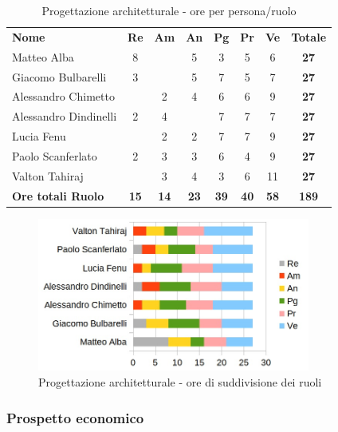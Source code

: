 		\begin{table} [h!]
			\begin{center}
				\begin{tabular} { m{3.5cm} c c c c c c c }
					\rowcolor{lightgray}
					\textbf{Nome} & \textbf{Re} & \textbf{Am} & \textbf{An} & \textbf{Pg} & \textbf{Pr} & \textbf{Ve} & \textbf{Totale} \\
					Matteo Alba & 8 & & 5 & 3 & 5 & 6 & \textbf{27} \\
					Giacomo Bulbarelli & 3 & & 5 & 7 & 5 & 7 & \textbf{27} \\
					Alessandro Chimetto & & 2 & 4 & 6 & 6 & 9 & \textbf{27} \\
					Alessandro Dindinelli & 2 & 4 & & 7 & 7 & 7 & \textbf{27} \\
					Lucia Fenu & & 2 & 2 & 7 & 7 & 9 & \textbf{27} \\
					Paolo Scanferlato & 2 & 3 & 3 & 6 & 4 & 9 & \textbf{27} \\
					Valton Tahiraj & & 3 & 4 & 3 & 6 & 11 & \textbf{27} \\
					\textbf{Ore totali Ruolo} & \textbf{15} & \textbf{14} & \textbf{23} & \textbf{39} & \textbf{40}& \textbf{58} & \textbf{189}
				\end{tabular}
				\caption{Progettazione architetturale - ore per persona/ruolo}
			\end{center}
		\end{table}
		
		\begin{figure} [h!]
			\centering
			\includegraphics[width=0.8\textwidth]{res/img/grafici/progettazione_architetturale_ore_ruolo.jpg}
			\caption{Progettazione architetturale - ore di suddivisione dei ruoli} 
		\end{figure}
		
	\newpage
	
	\subsubsection{Prospetto economico}
	
